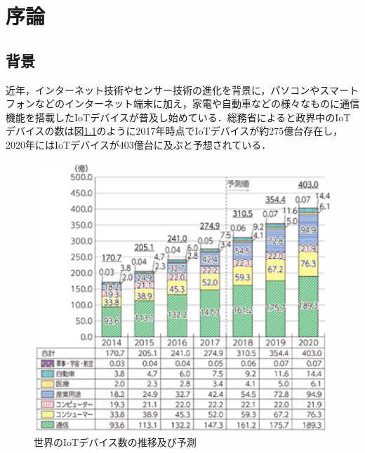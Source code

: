 \chapter{序論} %


\section{背景} %


近年，インターネット技術やセンサー技術の進化を背景に，パソコンやスマートフォンなどのインターネット端末に加え，家電や自動車などの様々なものに通信機能を搭載したIoTデバイスが普及し始めている．総務省によると政界中のIoTデバイスの数は図\ref{fig:IoT}のように2017年時点でIoTデバイスが約275億台存在し，2020年にはIoTデバイスが403億台に及ぶと予想されている\cite{IoT}．
 \begin{figure}[hb]
 \centering
    \includegraphics{figures/IoT_device.eps}
    \caption{世界のIoTデバイス数の推移及び予測}
 \label{fig:IoT}
 \end{figure}
 \clearpage

